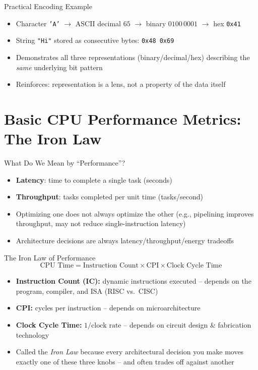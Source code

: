 \documentclass[10pt, aspectratio=169]{beamer}
\begin{document}
\begin{frame}{Practical Encoding Example}
\begin{itemize}
    \item Character \texttt{'A'} $\rightarrow$ ASCII decimal $65$ $\rightarrow$ binary $0100\,0001$ $\rightarrow$ hex \texttt{0x41}
    \item String \texttt{"Hi"} stored as consecutive bytes: \texttt{0x48 0x69}
    \item Demonstrates all three representations (binary/decimal/hex) describing the \emph{same} underlying bit pattern
    \item Reinforces: representation is a lens, not a property of the data itself
\end{itemize}
\end{frame}

\section{Basic CPU Performance Metrics: The Iron Law}

\begin{frame}{What Do We Mean by ``Performance''?}
\begin{itemize}
    \item \textbf{Latency}: time to complete a single task (seconds)
    \item \textbf{Throughput}: tasks completed per unit time (tasks/second)
    \item Optimizing one does not always optimize the other (e.g., pipelining improves throughput, may not reduce single-instruction latency)
    \item Architecture decisions are always latency/throughput/energy tradeoffs
\end{itemize}
\end{frame}

\begin{frame}{The Iron Law of Performance}
\[
\text{CPU Time} = \text{Instruction Count} \times \text{CPI} \times \text{Clock Cycle Time}
\]
\begin{itemize}
    \item \textbf{Instruction Count (IC):} dynamic instructions executed -- depends on the program, compiler, and ISA (RISC vs.\ CISC)
    \item \textbf{CPI:} cycles per instruction -- depends on microarchitecture
    \item \textbf{Clock Cycle Time:} $1/\text{clock rate}$ -- depends on circuit design \& fabrication technology
    \item Called the \emph{Iron Law} because every architectural decision you make moves exactly one of these three knobs -- and often trades off against another
\end{itemize}
\end{frame}
\end{document}
